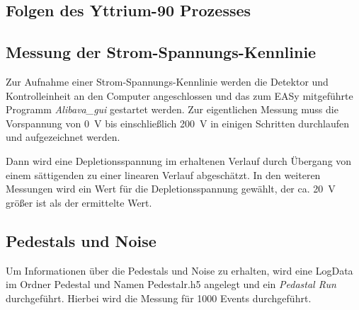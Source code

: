 \subsection{Folgen des Yttrium-90 Prozesses}
\label{sec:Yttrium}

\subsection{Messung der Strom-Spannungs-Kennlinie}
\label{sec:Kennlinie}
Zur Aufnahme einer Strom-Spannungs-Kennlinie werden die Detektor und Kontrolleinheit
an den Computer angeschlossen und das zum EASy mitgeführte Programm \textit{Alibava\_gui}
gestartet werden. Zur eigentlichen Messung muss die Vorspannung von \SI{0}{\volt} bis
einschließlich \SI{200}{\volt} in einigen Schritten durchlaufen und aufgezeichnet werden.

Dann wird eine Depletionsspannung im erhaltenen Verlauf durch Übergang von einem
sättigenden zu einer linearen Verlauf abgeschätzt. In den weiteren Messungen wird
ein Wert für die Depletionsspannung gewählt, der ca. \SI{20}{\volt} größer ist als
der ermittelte Wert.

\subsection{Pedestals und Noise}
\label{sec:Auswertung_Noise}
Um Informationen über die Pedestals und Noise zu erhalten, wird eine LogData im
Ordner Pedestal und Namen Pedestalr.h5 angelegt und ein \textit{Pedastal Run}
durchgeführt. Hierbei wird die Messung für 1000 Events durchgeführt.

